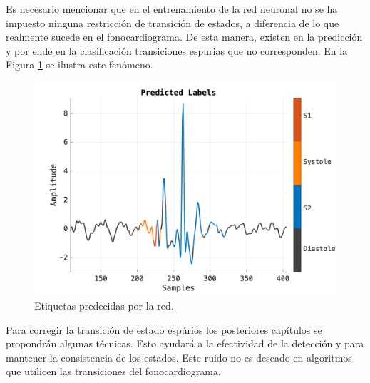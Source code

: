 \indent Es necesario mencionar que en el entrenamiento de la red neuronal no se ha impuesto ninguna restricción de
transición de estados, a diferencia de lo que realmente sucede en el fonocardiograma. De esta manera, existen en la
predicción y por ende en la clasificación transiciones espurias que no corresponden. En la Figura
\ref{fig:spurious-transitions} se ilustra este fenómeno.

\begin{figure}[H]
  \centering
  \includegraphics[scale=0.3]{sections/chapter-07/images/predicted-labels.png}
  \caption[Etiquetas predecidas por la red]{Etiquetas predecidas por la red.}
  \label{fig:spurious-transitions}
\end{figure}

\indent Para corregir la transición de estado espúrios los posteriores capítulos se propondrán algunas técnicas.
Esto ayudará a la efectividad de la detección y para mantener la consistencia de los estados. Este ruido no es
deseado en algoritmos que utilicen las transiciones del fonocardiograma.
